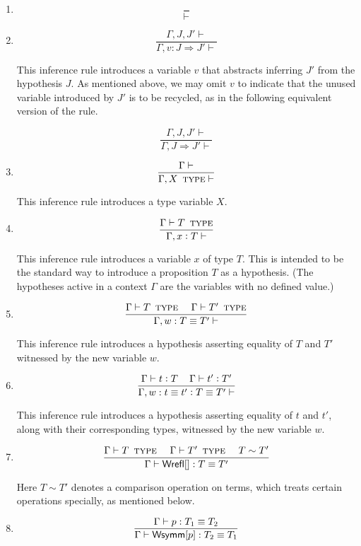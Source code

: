 \documentclass[11pt]{article}
\newcommand{\eqd}{\equiv}
\newcommand\spc{{\,\,\,\,\,\,\,}}
\newcommand{\ccolon}{\vcentcolon}
\newcommand{\Type}{\mathop{\text{ \sc type}}}
\newcommand{\Okay}{\mathop{\text{ \sc okay}}}
\newcommand{\Context}{\vdash\Okay}
\renewcommand{\Context}{\vdash}
\newcommand{\ha}[2]{#1[#2]}
\newcommand{\Wrefl}{{\sf Wrefl}}
\newcommand{\Wsymm}{{\sf Wsymm}}
\begin{document}
\begin{enumerate}

\item
$$\frac{}{\Context}$$

\item
$$\frac{\Gamma,J,J'\Context}{\Gamma,v : J \Rightarrow J' \Context}$$

This inference rule introduces a variable $v$ that abstracts inferring $J'$ from the hypothesis $J$.
As mentioned above, we may omit $v$ to indicate that the unused variable introduced by $J'$ is to be recycled, as 
in the following equivalent version of the rule.

$$\frac{\Gamma,J,J'\Context}{\Gamma,J \Rightarrow J' \Context}$$

\item
$$\frac{\Gamma\Context}{\Gamma, X \Type \Context}$$

This inference rule introduces a type variable $X$.

\item
$$\frac{\Gamma \vdash T \Type}{\Gamma, x \ccolon T \Context}$$

This inference rule introduces a variable $x$ of type $T$.  This is intended to be the
standard way to introduce a proposition $T$ as a hypothesis.  (The hypotheses
active in a context $\Gamma$ are the variables with no defined value.)

\item
$$\frac{
  \Gamma \vdash T \Type  
  \spc
  \Gamma \vdash T' \Type }
{\Gamma, w : T \eqd T' \Context}$$

This inference rule introduces a hypothesis asserting equality of $T$ and $T'$ witnessed
by the new variable $w$.

\item
  \[\frac{
  \Gamma \vdash t \ccolon T
  \spc
  \Gamma \vdash t' \ccolon T'
  } {
  \Gamma, w : t \eqd t' \ccolon T \eqd T' \Context}\]

This inference rule introduces a hypothesis asserting equality of $t$ and $t'$, along
with their corresponding types, witnessed by the new variable $w$.

\item 
\[\frac{\Gamma \vdash T \Type \spc \Gamma \vdash T' \Type
  \spc T\sim T'}{
  \Gamma \vdash \ha\Wrefl{}: T\eqd T' 
}
\]

Here $T\sim T'$ denotes a comparison operation on terms, which treats certain
operations specially, as mentioned below.

\item 
$$\frac{\Gamma \vdash p:T_1\eqd T_2 }{\Gamma \vdash \ha\Wsymm{p}:T_2\eqd T_1}$$


\end{enumerate}
\end{document}
